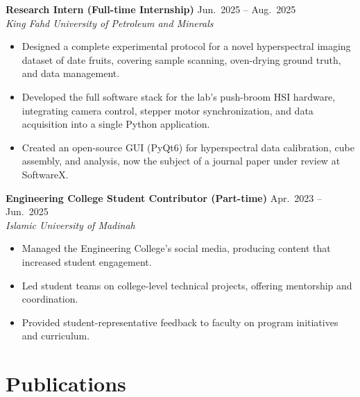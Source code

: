 \documentclass[a4paper,11pt]{article}
\begin{document}
\textbf{Research Intern (Full-time Internship)} \hfill Jun.\ 2025 -- Aug.\ 2025 \\
\textit{King Fahd University of Petroleum and Minerals}
\begin{itemize}
    \item Designed a complete experimental protocol for a novel hyperspectral imaging dataset of date fruits, covering sample scanning, oven-drying ground truth, and data management.
    \item Developed the full software stack for the lab's push-broom HSI hardware, integrating camera control, stepper motor synchronization, and data acquisition into a single Python application.
    \item Created an open-source GUI (PyQt6) for hyperspectral data calibration, cube assembly, and analysis, now the subject of a journal paper under review at SoftwareX.
\end{itemize}

\textbf{Engineering College Student Contributor (Part-time)} \hfill Apr.\ 2023 -- Jun.\ 2025 \\
\textit{Islamic University of Madinah}
\begin{itemize}
    \item Managed the Engineering College's social media, producing content that increased student engagement.
    \item Led student teams on college-level technical projects, offering mentorship and coordination.
    \item Provided student-representative feedback to faculty on program initiatives and curriculum.
\end{itemize}

\section{Publications}
\end{document}
